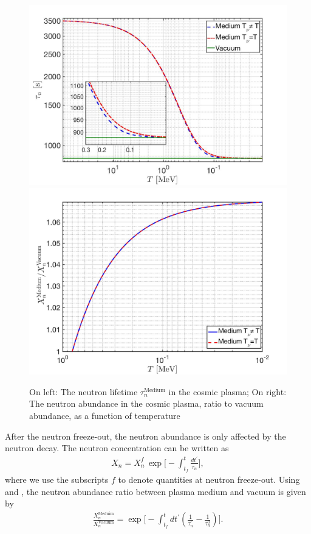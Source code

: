 \begin{figure} 
\centerline{\includegraphics[width=0.5\linewidth]{./plots/Neutron_Lifetime_001}\hspace*{-0.5cm}
\includegraphics[width=0.5\linewidth]{./plots/Neutron_Abundance}}
\caption{On left: The neutron lifetime $\tau_n^\mathrm{Medium}$ in the cosmic plasma; On right: The neutron abundance in the cosmic plasma, ratio to vacuum  abundance, as a function of temperature}
\label{Decay:Rate}
\end{figure}

After the neutron freeze-out, the neutron abundance is only affected by the neutron decay. The neutron concentration can be written as 
\begin{align}
\label{Abundance}
X_n=X_n^f\,\exp\bigg[-\int^t_{t_f}\frac{dt^\prime}{\tau_n}\bigg],
\end{align}
where we use the subscripts $f$ to denote quantities at neutron freeze-out. Using  and , the neutron abundance ratio between plasma medium and vacuum is given by
\begin{align}
\label{Abundance_Ratio}
\frac{X_n^{\mathrm{Meduim}}}{X_n^{\mathrm{Vacuum}}}=\exp\bigg[-\int^t_{t_f}dt^\prime\left(\frac{1}{\tau^\prime_n}-\frac{1}{\tau^0_n}\right)\bigg].
\end{align}

